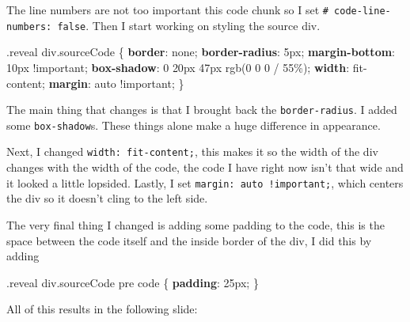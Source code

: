 \documentclass[
  letterpaper,
  DIV=11,
  numbers=noendperiod]{scrreprt}
\newenvironment{Shaded}{\begin{snugshade}}{\end{snugshade}}
\newcommand{\AttributeTok}[1]{\textcolor[rgb]{0.40,0.45,0.13}{#1}}
\newcommand{\BuiltInTok}[1]{\textcolor[rgb]{0.00,0.23,0.31}{#1}}
\newcommand{\DataTypeTok}[1]{\textcolor[rgb]{0.68,0.00,0.00}{#1}}
\newcommand{\DecValTok}[1]{\textcolor[rgb]{0.68,0.00,0.00}{#1}}
\newcommand{\FunctionTok}[1]{\textcolor[rgb]{0.28,0.35,0.67}{#1}}
\newcommand{\KeywordTok}[1]{\textcolor[rgb]{0.00,0.23,0.31}{\textbf{#1}}}
\newcommand{\NormalTok}[1]{\textcolor[rgb]{0.00,0.23,0.31}{#1}}
\newcommand{\OperatorTok}[1]{\textcolor[rgb]{0.37,0.37,0.37}{#1}}
\begin{document}
The line numbers are not too important this code chunk so I set
\texttt{\#\textbar{}\ code-line-numbers:\ false}. Then I start working
on styling the source div.

\begin{Shaded}
\begin{Highlighting}[]
\FunctionTok{.reveal}\NormalTok{ div}\FunctionTok{.sourceCode}\NormalTok{ \{}
  \KeywordTok{border}\NormalTok{: }\DecValTok{none}\OperatorTok{;}
  \KeywordTok{border{-}radius}\NormalTok{: }\DecValTok{5}\DataTypeTok{px}\OperatorTok{;}
  \KeywordTok{margin{-}bottom}\NormalTok{: }\DecValTok{10}\DataTypeTok{px} \AttributeTok{!important}\OperatorTok{;}
  \KeywordTok{box{-}shadow}\NormalTok{: }\DecValTok{0} \DecValTok{20}\DataTypeTok{px} \DecValTok{47}\DataTypeTok{px} \FunctionTok{rgb(}\DecValTok{0} \DecValTok{0} \DecValTok{0} \OperatorTok{/} \DecValTok{55}\DataTypeTok{\%}\FunctionTok{)}\OperatorTok{;}
  \KeywordTok{width}\NormalTok{: }\DecValTok{fit{-}content}\OperatorTok{;}
  \KeywordTok{margin}\NormalTok{: }\BuiltInTok{auto} \AttributeTok{!important}\OperatorTok{;}
\NormalTok{\}}
\end{Highlighting}
\end{Shaded}

The main thing that changes is that I brought back the
\texttt{border-radius}. I added some \texttt{box-shadow}s. These things
alone make a huge difference in appearance.

Next, I changed \texttt{width:\ fit-content;}, this makes it so the
width of the div changes with the width of the code, the code I have
right now isn't that wide and it looked a little lopsided. Lastly, I set
\texttt{margin:\ auto\ !important;}, which centers the div so it doesn't
cling to the left side.

The very final thing I changed is adding some padding to the code, this
is the space between the code itself and the inside border of the div, I
did this by adding

\begin{Shaded}
\begin{Highlighting}[]
\FunctionTok{.reveal}\NormalTok{ div}\FunctionTok{.sourceCode}\NormalTok{ pre code \{}
  \KeywordTok{padding}\NormalTok{: }\DecValTok{25}\DataTypeTok{px}\OperatorTok{;}
\NormalTok{\}}
\end{Highlighting}
\end{Shaded}

All of this results in the following slide:
\end{document}
